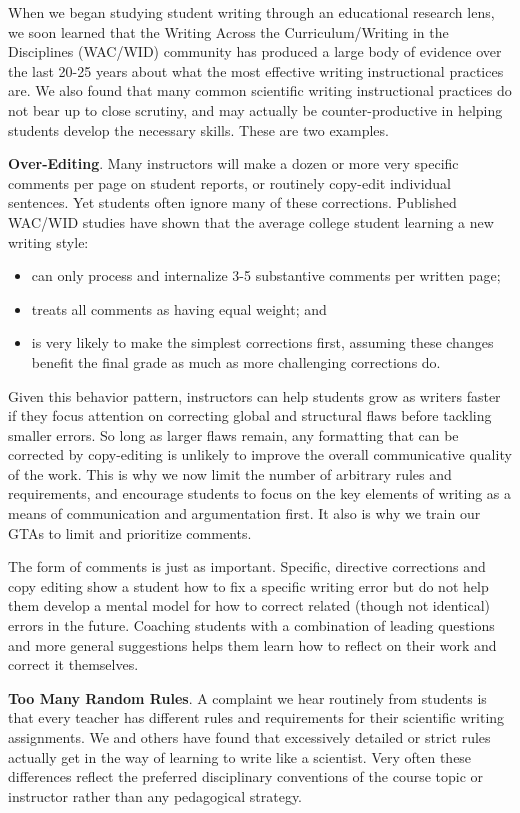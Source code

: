 \documentclass[
]{book}
\providecommand{\tightlist}{%
  \setlength{\itemsep}{0pt}\setlength{\parskip}{0pt}}
\begin{document}
When we began studying student writing through an educational research lens, we soon learned that the Writing Across the Curriculum/Writing in the Disciplines (WAC/WID) community has produced a large body of evidence over the last 20-25 years about what the most effective writing instructional practices are. We also found that many common scientific writing instructional practices do not bear up to close scrutiny, and may actually be counter-productive in helping students develop the necessary skills. These are two examples.

\textbf{Over-Editing}. Many instructors will make a dozen or more very specific comments per page on student reports, or routinely copy-edit individual sentences. Yet students often ignore many of these corrections. Published WAC/WID studies have shown that the average college student learning a new writing style:

\begin{itemize}
\tightlist
\item
  can only process and internalize 3-5 substantive comments per written page;
\item
  treats all comments as having equal weight; and
\item
  is very likely to make the simplest corrections first, assuming these changes benefit the final grade as much as more challenging corrections do.
\end{itemize}

Given this behavior pattern, instructors can help students grow as writers faster if they focus attention on correcting global and structural flaws before tackling smaller errors. So long as larger flaws remain, any formatting that can be corrected by copy-editing is unlikely to improve the overall communicative quality of the work. This is why we now limit the number of arbitrary rules and requirements, and encourage students to focus on the key elements of writing as a means of communication and argumentation first. It also is why we train our GTAs to limit and prioritize comments.

The form of comments is just as important. Specific, directive corrections and copy editing show a student how to fix a specific writing error but do not help them develop a mental model for how to correct related (though not identical) errors in the future. Coaching students with a combination of leading questions and more general suggestions helps them learn how to reflect on their work and correct it themselves.

\textbf{Too Many Random Rules}. A complaint we hear routinely from students is that every teacher has different rules and requirements for their scientific writing assignments. We and others have found that excessively detailed or strict rules actually get in the way of learning to write like a scientist. Very often these differences reflect the preferred disciplinary conventions of the course topic or instructor rather than any pedagogical strategy.
\end{document}

